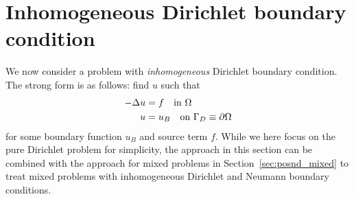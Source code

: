 

\section{Inhomogeneous Dirichlet boundary condition}
We now consider a problem with \emph{inhomogeneous} Dirichlet boundary condition.  The strong form is as follows: find $u$ such that
\begin{align}
  -\Delta u &= f \quad \text{in } \Omega \label{eq:posnd_inhomo_bc_strong} \\
  u &= u_B \quad \text{on } \Gamma_D \equiv \partial \Omega \notag
\end{align}
for some boundary function $u_B$ and source term $f$. While we here focus on the pure Dirichlet problem for simplicity, the approach in this section can be combined with the approach for mixed problems in Section~\ref{sec:posnd_mixed} to treat mixed problems with inhomogeneous Dirichlet and Neumann boundary conditions.

